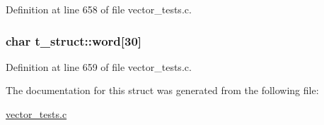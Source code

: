 \-Definition at line 658 of file vector\-\_\-tests.\-c.

\hypertarget{structt__struct_ab5b290b572fc4036f1e5efc671098c7f}{
\subsubsection[{word}]{\setlength{\rightskip}{0pt plus 5cm}char {\bf t\-\_\-struct\-::word}\mbox{[}30\mbox{]}}}\label{structt__struct_ab5b290b572fc4036f1e5efc671098c7f}


\-Definition at line 659 of file vector\-\_\-tests.\-c.



\-The documentation for this struct was generated from the following file\-:\begin{DoxyCompactItemize}
\item 
\hyperlink{vector__tests_8c}{vector\-\_\-tests.\-c}\end{DoxyCompactItemize}
